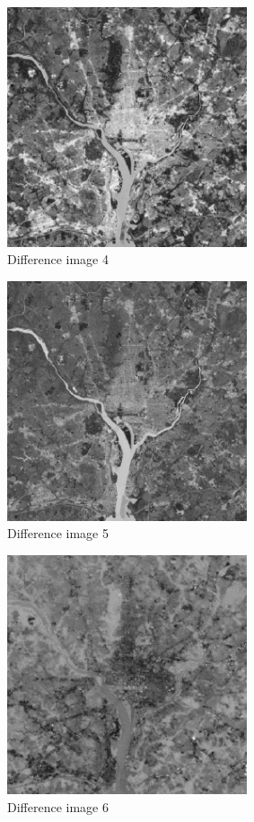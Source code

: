\documentclass[10pt]{article}
\begin{document}
\begin{figure}[!ht]
	\centering
	\includegraphics[height=200pt]{./ex10/Wash4diff.jpg}
	\caption{Difference image 4}
\end{figure}
\begin{figure}[!ht]
	\centering
	\includegraphics[height=200pt]{./ex10/Wash5diff.jpg}
	\caption{Difference image 5}
\end{figure}
\begin{figure}[!ht]
	\centering
	\includegraphics[height=200pt]{./ex10/Wash6diff.jpg}
	\caption{Difference image 6}
\end{figure}
\end{document}
